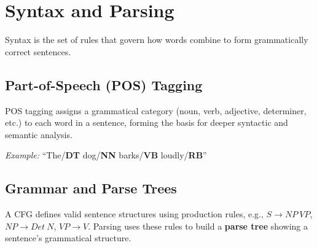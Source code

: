 \documentclass[11pt,a4paper]{article}
\begin{document}
\section{Syntax and Parsing}

\begin{definitionbox}[Syntax]
Syntax is the set of rules that govern how words combine to form grammatically correct sentences.
\end{definitionbox}

\subsection{Part-of-Speech (POS) Tagging}
\begin{conceptbox}
POS tagging assigns a grammatical category (noun, verb, adjective, determiner, etc.) to each word in a sentence, forming the basis for deeper syntactic and semantic analysis.
\end{conceptbox}
\textit{Example:} ``The/\textbf{DT} dog/\textbf{NN} barks/\textbf{VB} loudly/\textbf{RB}''

\subsection{Grammar and Parse Trees}
\begin{definitionbox}
A CFG defines valid sentence structures using production rules, e.g., $S \to NP\ VP$, $NP \to Det\ N$, $VP \to V$. Parsing uses these rules to build a \textbf{parse tree} showing a sentence's grammatical structure.
\end{definitionbox}

\begin{center}
\end{center}
\end{document}
